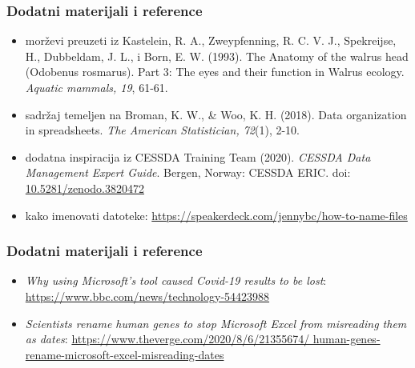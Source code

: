 \documentclass[aspectratio=169]{beamer}
\newenvironment{noheadline}{
    \setbeamertemplate{headline}{}
}{}
\begin{document}
\begin{noheadline}
    \begin{frame}
        \frametitle{Dodatni materijali i reference}

        \fontsize{10}{12}\selectfont

        \begin{itemize}
            \setlength{\itemsep}{1em}
            
            \item morževi preuzeti iz Kastelein, R. A., Zweypfenning, R. C. V.
                J., Spekreijse, H., Dubbeldam, J. L., i Born, E. W. (1993). The
                Anatomy of the walrus head (Odobenus rosmarus). Part 3: The eyes
                and their function in Walrus ecology. \textit{Aquatic mammals, 19},
                61-61.

            \item sadržaj temeljen na Broman, K. W., & Woo, K. H. (2018). Data
                organization in spreadsheets. \textit{The American Statistician,
                72}(1), 2-10.

            \item dodatna inspiracija iz CESSDA Training Team (2020). \textit{CESSDA
                Data Management Expert Guide}. Bergen, Norway: CESSDA ERIC. doi:
                \url{10.5281/zenodo.3820472}

            \item kako imenovati datoteke:
                \url{https://speakerdeck.com/jennybc/how-to-name-files}
            
        \end{itemize}
    \end{frame}
\end{noheadline}

\begin{noheadline}
    \begin{frame}
        \frametitle{Dodatni materijali i reference}

        \begin{itemize}
            \setlength{\itemsep}{1em}

            \item \textit{Why using Microsoft's tool caused Covid-19 results to
                be lost}: \url{https://www.bbc.com/news/technology-54423988}

            \item \textit{Scientists rename human genes to stop Microsoft Excel
                from misreading them as dates}:
                \url{https://www.theverge.com/2020/8/6/21355674/
                human-genes-rename-microsoft-excel-misreading-dates}
            
        \end{itemize}
    \end{frame}
\end{noheadline}
\end{document}
